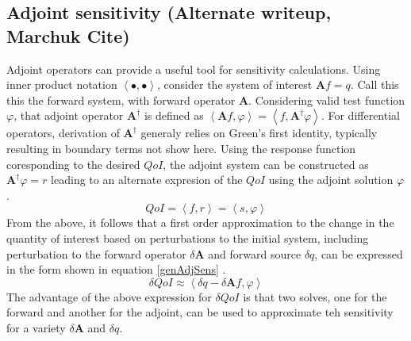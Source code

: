 \documentclass{article}
\newcommand{\bra}{\left\langle}
\newcommand{\ket}{\right\rangle}
\newcommand{\qoi}{QoI}
\begin{document}
\subsection{Adjoint sensitivity (Alternate writeup, Marchuk Cite)}
Adjoint operators can provide a useful tool for sensitivity calculations. Using inner product notation $\bra \bullet , \bullet \ket$, consider the system of interest $\mathbf{A}f = q$. Call this this the forward system, with forward operator $\mathbf{A}$. Considering valid test function $\varphi$, that adjoint operator $\mathbf{A^\dag}$ is defined as $\bra \mathbf{A} f, \varphi \ket = \bra f, \mathbf{A^\dag} \varphi \ket $. For differential operators, derivation of $\mathbf{A^\dag}$ generaly relies on Green's first identity, typically resulting in boundary terms not show here. Using the response function coresponding to the desired $\qoi$, the adjoint system can be constructed as $\mathbf{A^\dag} \varphi=r$ leading to an alternate expresion of the $\qoi$ using the adjoint solution $\varphi$.
\begin{equation}
\label{genAdjQoI}
\qoi = \bra f, r \ket = \bra s , \varphi \ket
\end{equation} 
From the above, it follows that a first order approximation to the change in the quantity of interest based on perturbations to the initial system, including perturbation to the forward operator $\delta \mathbf{A}$ and forward source $\delta q$, can be expressed in the form shown in equation \ref{genAdjSens} \cite{Marchuk}.
\begin{equation}
\label{genAdjSens}
\delta \qoi \approx \bra \delta q - \delta \mathbf{A} f , \varphi \ket 
\end{equation}
The advantage of the above expression for $\delta \qoi$ is that two solves, one for the forward and another for the adjoint, can be used to approximate teh sensitivity for a variety $\delta \mathbf{A}$ and $\delta q$.

 
\end{document}
